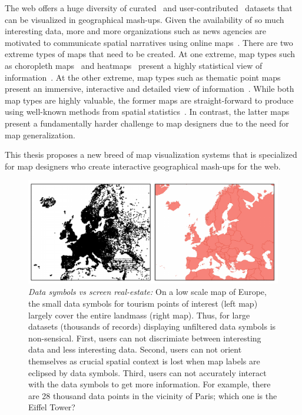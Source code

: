 \documentclass[11pt, oneside]{report}
\begin{document}
{%
The web offers a huge diversity of curated~\cite{gst2014digitalmapsupply} and user-contributed~\cite{openstreetmap, zooniverse2014oldweather} datasets that can be visualized in geographical mash-ups. Given the availability of so much interesting data, more and more organizations such as news agencies are motivated to communicate spatial narratives using online maps~\cite{nytimes2010iraq,guardian2013ananas}. There are two extreme types of maps that need to be created. At one extreme, map types such as choropleth maps~\cite{jenks1963generalization} and heatmaps~\cite{wiki2014heatmap} present a highly statistical view of information~\cite{guardian2013ananas}. At the other extreme, map types such as thematic point maps present an immersive, interactive and detailed view of information~\cite{nytimes2010iraq}. While both map types are highly valuable, the former maps are straight-forward to produce using well-known methods from spatial statistics~\cite{ripley2005spatial}. In contrast, the latter maps present a fundamentally harder challenge to map designers due to the need for map generalization.

This thesis proposes a new breed of map visualization systems that is specialized for map designers who create interactive geographical mash-ups for the web.


\begin{figure}[htbp]
\begin{center}
\includegraphics[scale=.5]{figs-thesis/data-draws-the-world.pdf}
\caption{\emph{Data symbols vs screen real-estate:} On a low scale map of Europe, the small data symbols for tourism points of interest (left map) largely cover the entire landmass (right map). Thus, for large datasets (thousands of records) displaying unfiltered data symbols is non-sensical. First, users can not discrimiate between interesting data and less interesting data. Second, users can not orient themselves as crucial spatial context is lost when map labels are eclipsed by data symbols. Third, users can not accurately interact with the data symbols to get more information. For example, there are 28 thousand data points in the vicinity of Paris; which one is the Eiffel Tower?}
\label{fig:raw:poi:data}
\end{center}
\vspace*{-4ex}
\end{figure}

}
\end{document}
